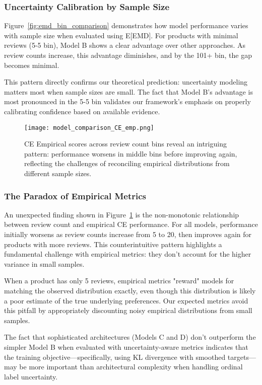 \documentclass[journal]{IEEEtran}
\begin{document}
\subsubsection{Uncertainty Calibration by Sample Size}

Figure~\ref{fig:emd_bin_comparison} demonstrates how model performance varies with sample size when evaluated using E[EMD]. For products with minimal reviews (5-5 bin), Model B shows a clear advantage over other approaches. As review counts increase, this advantage diminishes, and by the 101+ bin, the gap becomes minimal.

This pattern directly confirms our theoretical prediction: uncertainty modeling matters most when sample sizes are small. The fact that Model B's advantage is most pronounced in the 5-5 bin validates our framework's emphasis on properly calibrating confidence based on available evidence.

\begin{figure}[t]
    \centering
    \texttt{[image: model\_comparison\_CE\_emp.png]}
    \caption{CE Empirical scores across review count bins reveal an intriguing pattern: performance worsens in middle bins before improving again, reflecting the challenges of reconciling empirical distributions from different sample sizes.}
    \label{fig:ce_empirical_curve}
\end{figure}

\subsubsection{The Paradox of Empirical Metrics}

An unexpected finding shown in Figure~\ref{fig:ce_empirical_curve} is the non-monotonic relationship between review count and empirical CE performance. For all models, performance initially worsens as review counts increase from 5 to 20, then improves again for products with more reviews. This counterintuitive pattern highlights a fundamental challenge with empirical metrics: they don't account for the higher variance in small samples.

When a product has only 5 reviews, empirical metrics "reward" models for matching the observed distribution exactly, even though this distribution is likely a poor estimate of the true underlying preferences. Our expected metrics avoid this pitfall by appropriately discounting noisy empirical distributions from small samples.

The fact that sophisticated architectures (Models C and D) don't outperform the simpler Model B when evaluated with uncertainty-aware metrics indicates that the training objective—specifically, using KL divergence with smoothed targets—may be more important than architectural complexity when handling ordinal label uncertainty.
\end{document}
